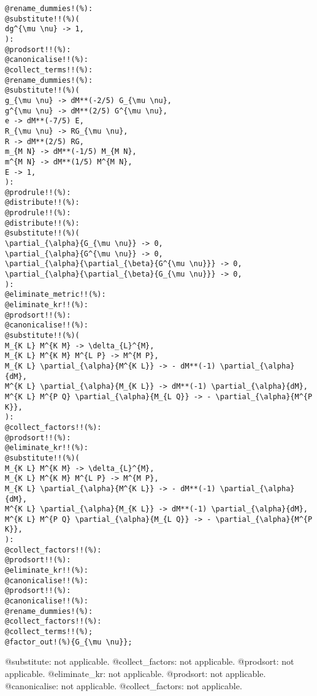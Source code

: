 \documentclass[11pt]{article}
\begin{document}
{\color[named]{Blue}\begin{verbatim}
@rename_dummies!(%):
@substitute!!(%)(
dg^{\mu \nu} -> 1,
):
@prodsort!!(%):
@canonicalise!!(%):
@collect_terms!!(%):
@rename_dummies!(%):
@substitute!!(%)(
g_{\mu \nu} -> dM**(-2/5) G_{\mu \nu},
g^{\mu \nu} -> dM**(2/5) G^{\mu \nu},
e -> dM**(-7/5) E,
R_{\mu \nu} -> RG_{\mu \nu},
R -> dM**(2/5) RG,
m_{M N} -> dM**(-1/5) M_{M N},
m^{M N} -> dM**(1/5) M^{M N},
E -> 1,
):
@prodrule!!(%):
@distribute!!(%):
@prodrule!!(%):
@distribute!!(%):
@substitute!!(%)(
\partial_{\alpha}{G_{\mu \nu}} -> 0,
\partial_{\alpha}{G^{\mu \nu}} -> 0,
\partial_{\alpha}{\partial_{\beta}{G^{\mu \nu}}} -> 0,
\partial_{\alpha}{\partial_{\beta}{G_{\mu \nu}}} -> 0,
):
@eliminate_metric!!(%):
@eliminate_kr!!(%):
@prodsort!!(%):
@canonicalise!!(%):
@substitute!!(%)(
M_{K L} M^{K M} -> \delta_{L}^{M},
M_{K L} M^{K M} M^{L P} -> M^{M P},
M_{K L} \partial_{\alpha}{M^{K L}} -> - dM**(-1) \partial_{\alpha}{dM},
M^{K L} \partial_{\alpha}{M_{K L}} -> dM**(-1) \partial_{\alpha}{dM},
M^{K L} M^{P Q} \partial_{\alpha}{M_{L Q}} -> - \partial_{\alpha}{M^{P K}},
):
@collect_factors!!(%):
@prodsort!!(%):
@eliminate_kr!!(%):
@substitute!!(%)(
M_{K L} M^{K M} -> \delta_{L}^{M},
M_{K L} M^{K M} M^{L P} -> M^{M P},
M_{K L} \partial_{\alpha}{M^{K L}} -> - dM**(-1) \partial_{\alpha}{dM},
M^{K L} \partial_{\alpha}{M_{K L}} -> dM**(-1) \partial_{\alpha}{dM},
M^{K L} M^{P Q} \partial_{\alpha}{M_{L Q}} -> - \partial_{\alpha}{M^{P K}},
):
@collect_factors!!(%):
@prodsort!!(%):
@eliminate_kr!!(%):
@canonicalise!!(%):
@prodsort!!(%):
@canonicalise!!(%):
@rename_dummies!(%):
@collect_factors!!(%):
@collect_terms!!(%);
@factor_out!(%){G_{\mu \nu}};
\end{verbatim}}
@substitute: not applicable.
@collect\_factors: not applicable.
@prodsort: not applicable.
@eliminate\_kr: not applicable.
@prodsort: not applicable.
@canonicalise: not applicable.
@collect\_factors: not applicable.
\end{document}
